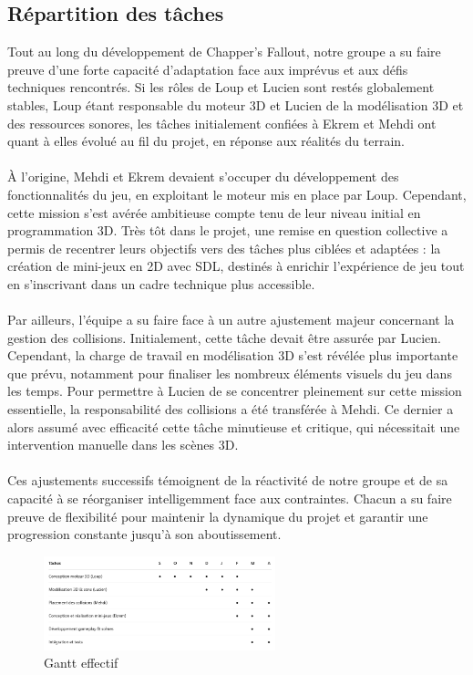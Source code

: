     \subsection{Répartition des tâches}
        Tout au long du développement de Chapper's Fallout, notre groupe a su faire preuve d’une forte capacité d’adaptation face aux imprévus et aux défis techniques rencontrés. 
        Si les rôles de Loup et Lucien sont restés globalement stables, Loup étant responsable du moteur 3D et Lucien de la modélisation 3D et des ressources sonores, les 
        tâches initialement confiées à Ekrem et Mehdi ont quant à elles évolué au fil du projet, en réponse aux réalités du terrain.
        \\ \\
        À l’origine, Mehdi et Ekrem devaient s’occuper du développement des \\fonctionnalités du jeu, en exploitant le moteur mis en place par Loup. Cependant, cette mission 
        s’est avérée ambitieuse compte tenu de leur niveau initial en programmation 3D. Très tôt dans le projet, une remise en question collective a permis de recentrer 
        leurs objectifs vers des tâches plus ciblées et adaptées : la création de mini-jeux en 2D avec SDL, destinés à enrichir l’expérience de jeu tout en s’inscrivant 
        dans un cadre technique plus accessible.
        \\ \\
        Par ailleurs, l’équipe a su faire face à un autre ajustement majeur concernant la gestion des collisions. Initialement, cette tâche devait être assurée par Lucien. 
        Cependant, la charge de travail en modélisation 3D s’est révélée plus importante que prévu, notamment pour finaliser les nombreux éléments visuels du jeu dans les 
        temps. Pour permettre à Lucien de se concentrer pleinement sur cette mission essentielle, la responsabilité des collisions a été transférée à Mehdi. Ce dernier a 
        alors assumé avec efficacité cette tâche minutieuse et critique, qui nécessitait une intervention manuelle dans les scènes 3D. 
        \\ \\
        Ces ajustements successifs témoignent de la réactivité de notre groupe et de sa capacité à se réorganiser intelligemment face aux contraintes. Chacun a su faire 
        preuve de flexibilité pour maintenir la dynamique du projet et garantir une progression constante jusqu’à son aboutissement. 
        \begin{figure}[h]
            \centering
            \includegraphics[width=0.6\textwidth]{images/gantt_effectif.png}
            \caption{Gantt effectif}
            \label{fig:gantt_effectif}
        \end{figure}
